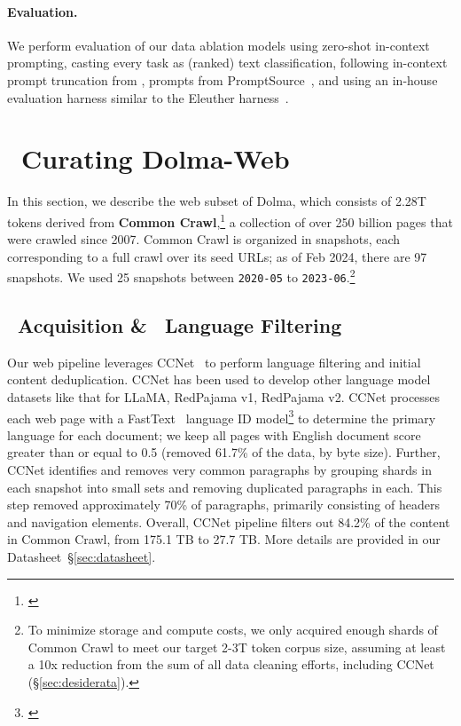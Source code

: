 \documentclass{article}
\newcommand{\dolma}{Dolma\xspace}
\newcommand{\dolmaWeb}{{\color{VarnishAlfaFour}\faGlobe}\xspace}
\newcommand{\toolkitWget}{{\color{VarnishNovemberThree}\faDownload}\xspace}
\newcommand{\toolkitFilter}{{\color{VarnishNovemberThree}\faFilter}\xspace}
\begin{document}
\paragraph{Evaluation.} We perform evaluation of our data ablation models using zero-shot in-context prompting, casting every task as (ranked) text classification, following in-context prompt truncation from \citet{min-etal-2022-metaicl}, prompts from PromptSource~\citep{bach2022promptsource}, and using an in-house evaluation harness similar to the Eleuther harness~\citep{eval-harness}.

\section{\dolmaWeb~Curating Dolma-Web}
\label{sec:common-crawl}

In this section, we describe the web subset of \dolma, which  consists of 2.28T tokens derived from \textbf{Common Crawl},\footnote{\href{https://commoncrawl.org}{}}
a collection of over 250 billion pages that were crawled since 2007.
Common Crawl is organized in snapshots, each corresponding to a full crawl over its seed URLs;
as of Feb 2024, there are 97 snapshots.
We used 25 snapshots between \texttt{2020-05} to \texttt{2023-06}.\footnote{To minimize storage and compute costs, we only acquired enough shards of Common Crawl to meet our target 2-3T token corpus size, assuming at least a 10x reduction from the sum of all data cleaning efforts, including CCNet (\S\ref{sec:desiderata}).}

\subsection{\toolkitWget~Acquisition \& \toolkitFilter~Language Filtering}
\label{sec:web:acquisition}

Our web pipeline leverages CCNet~\citep{wenzek-etal-2020-ccnet} to perform language filtering and initial content deduplication.
CCNet has been used to develop other language model datasets like that for LLaMA, RedPajama v1, RedPajama v2.
CCNet processes each web page with a FastText~\citep{joulin2016fasttext} language ID model\footnote{\href{https://fasttext.cc/docs/en/language-identification.html}{}} to determine the primary language for each document; 
we keep all pages with English document score greater than or equal to 0.5 (removed 61.7\% of the data, by byte size). 
Further, CCNet identifies and removes very common paragraphs by grouping shards in each snapshot into small sets and removing duplicated paragraphs in each.
This step removed approximately 70\% of paragraphs, primarily consisting of headers and navigation elements.
Overall, CCNet pipeline filters out 84.2\% of the content in Common Crawl, from 175.1 TB to 27.7 TB. 
More details are provided in our Datasheet~\S\ref{sec:datasheet}.
\end{document}
